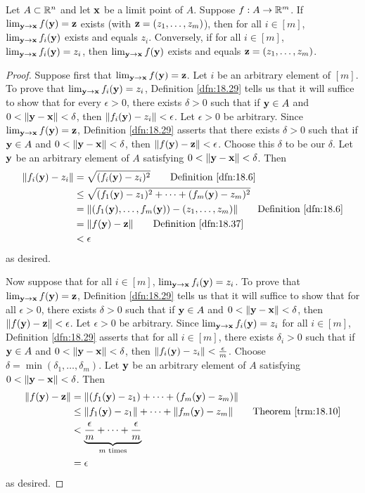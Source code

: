 \documentclass[../main.tex]{subfiles}
\begin{document}
\begin{theorem}\label{trm:18.38}
    Let $A\subset\mathbb{R}^n$ and let $\mathbf{x}$ be a limit point of $A$. Suppose $f:A\to\mathbb{R}^m$. If $\lim_{\mathbf{y}\to\mathbf{x}}f(\mathbf{y})=\mathbf{z}$ exists (with $\mathbf{z}=(z_1,\dots,z_m)$), then for all $i\in[m]$, $\lim_{\mathbf{y}\to\mathbf{x}}f_i(\mathbf{y})$ exists and equals $z_i$. Conversely, if for all $i\in[m]$, $\lim_{\mathbf{y}\to\mathbf{x}}f_i(\mathbf{y})=z_i$, then $\lim_{\mathbf{y}\to\mathbf{x}}f(\mathbf{y})$ exists and equals $\mathbf{z}=(z_1,\dots,z_m)$.
    \begin{proof}
        Suppose first that $\lim_{\mathbf{y}\to\mathbf{x}}f(\mathbf{y})=\mathbf{z}$. Let $i$ be an arbitrary element of $[m]$. To prove that $\lim_{\mathbf{y}\to\mathbf{x}}f_i(\mathbf{y})=z_i$, Definition \ref{dfn:18.29} tells us that it will suffice to show that for every $\epsilon>0$, there exists $\delta>0$ such that if $\mathbf{y}\in A$ and $0<\norm{\mathbf{y}-\mathbf{x}}<\delta$, then $\norm{f_i(\mathbf{y})-z_i}<\epsilon$. Let $\epsilon>0$ be arbitrary. Since $\lim_{\mathbf{y}\to\mathbf{x}}f(\mathbf{y})=\mathbf{z}$, Definition \ref{dfn:18.29} asserts that there exists $\delta>0$ such that if $\mathbf{y}\in A$ and $0<\norm{\mathbf{y}-\mathbf{x}}<\delta$, then $\norm{f(\mathbf{y})-\mathbf{z}}<\epsilon$. Choose this $\delta$ to be our $\delta$. Let $\mathbf{y}$ be an arbitrary element of $A$ satisfying $0<\norm{\mathbf{y}-\mathbf{x}}<\delta$. Then
        \begin{align*}
            \norm{f_i(\y)-z_i} &= \sqrt{(f_i(\y)-z_i)^2}\tag*{Definition \ref{dfn:18.6}}\\
            &\leq \sqrt{(f_1(\y)-z_1)^2+\cdots+(f_m(\y)-z_m)^2}\\
            &= \norm{(f_1(\y),\dots,f_m(\y))-(z_1,\dots,z_m)}\tag*{Definition \ref{dfn:18.6}}\\
            &= \norm{f(\y)-\z}\tag*{Definition \ref{dfn:18.37}}\\
            &< \epsilon
        \end{align*}
        as desired.\par
        Now suppose that for all $i\in[m]$, $\lim_{\mathbf{y}\to\mathbf{x}}f_i(\mathbf{y})=z_i$. To prove that $\lim_{\mathbf{y}\to\mathbf{x}}f(\mathbf{y})=\mathbf{z}$, Definition \ref{dfn:18.29} tells us that it will suffice to show that for all $\epsilon>0$, there exists $\delta>0$ such that if $\mathbf{y}\in A$ and $0<\norm{\mathbf{y}-\mathbf{x}}<\delta$, then $\norm{f(\mathbf{y})-\mathbf{z}}<\epsilon$. Let $\epsilon>0$ be arbitrary. Since $\lim_{\mathbf{y}\to\mathbf{x}}f_i(\mathbf{y})=z_i$ for all $i\in[m]$, Definition \ref{dfn:18.29} asserts that for all $i\in[m]$, there exists $\delta_i>0$ such that if $\mathbf{y}\in A$ and $0<\norm{\mathbf{y}-\mathbf{x}}<\delta$, then $\norm{f_i(\mathbf{y})-z_i}<\frac{\epsilon}{m}$. Choose $\delta=\min(\delta_1,\dots,\delta_m)$. Let $\mathbf{y}$ be an arbitrary element of $A$ satisfying $0<\norm{\mathbf{y}-\mathbf{x}}<\delta$. Then
        \begin{align*}
            \norm{f(\y)-\z} &= \norm{(f_1(\y)-z_1)+\cdots+(f_m(\y)-z_m)}\\
            &\leq \norm{f_1(\y)-z_1}+\cdots+\norm{f_m(\y)-z_m}\tag*{Theorem \ref{trm:18.10}}\\
            &< \underbrace{\frac{\epsilon}{m}+\cdots+\frac{\epsilon}{m}}_{m\text{ times}}\\
            &= \epsilon
        \end{align*}
        as desired.
    \end{proof}
\end{theorem}
\end{document}

